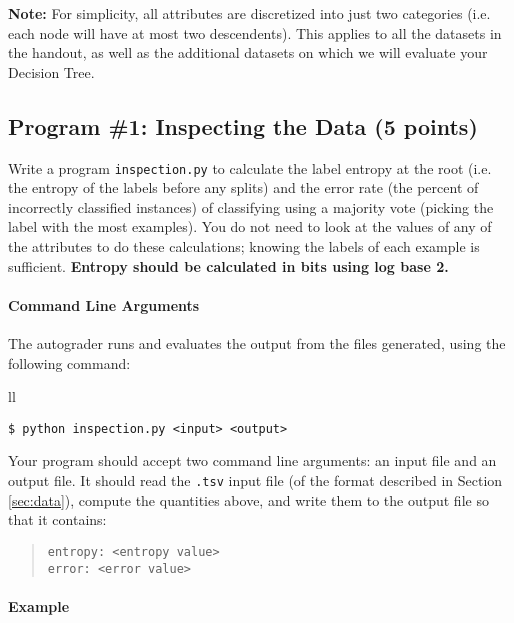 \begin{notebox} \textbf{Note:}
For simplicity, all attributes are discretized into just two categories (i.e. each node will have at most two descendents). This applies to all the datasets in the handout, as well as the additional datasets on which we will evaluate your Decision Tree.
\end{notebox}

\subsection{Program \#1: Inspecting the Data (5 points)}
\label{sec:inspect}

    Write a program \texttt{inspection.py} to calculate the label entropy at the root (i.e. the entropy of the labels before any splits) and the error rate (the percent of incorrectly classified instances) of classifying using a majority vote (picking the label with the most examples). You do not need to look at the values of any of the attributes to do these calculations; knowing the labels of each example is sufficient. \textbf{Entropy should be calculated in bits using log base 2.}

\paragraph{Command Line Arguments}
The autograder runs and evaluates the output from the files  generated, using the following command:

\begin{tabular}{ll}
\begin{lstlisting}[language=Shell]
$ python inspection.py <input> <output>
\end{lstlisting}
\end{tabular}

Your program should accept two command line arguments: an input file and an output file. It should read the \lstinline{.tsv} input file (of the format described in Section \ref{sec:data}), compute the quantities above, and write them to the output file so that it contains:
\begin{quote}
\begin{verbatim}
entropy: <entropy value>
error: <error value>
\end{verbatim}
\end{quote}

\paragraph{Example}

